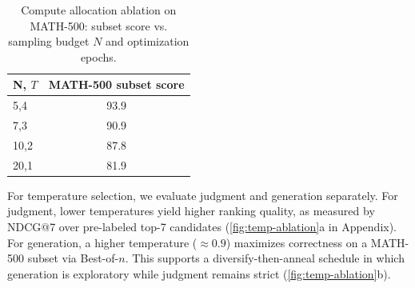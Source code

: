 \documentclass{article}
\theoremstyle{plain}
\theoremstyle{definition}
\theoremstyle{remark}
\begin{document}
\begin{table}[t]
\caption{Compute allocation ablation on MATH-500: subset score vs. sampling budget \(N\) and optimization epochs.}
\label{tab:ablation-N-epochs}
\vskip 0.1in
\centering
\begin{small}
\begin{sc}
\begin{tabular}{lc}
\toprule
N, \(T\) & MATH-500 subset score \\
\midrule
5,4 & 93.9 \\
7,3 & 90.9 \\
10,2 & 87.8 \\
20,1 & 81.9 \\
\bottomrule
\end{tabular}
\end{sc}
\end{small}
\vskip -0.2in
\end{table}


\noindent For temperature selection, we evaluate judgment and generation separately. For judgment, lower temperatures yield higher ranking quality, as measured by NDCG@7 over pre-labeled top-7 candidates (\cref{fig:temp-ablation}a in Appendix). For generation, a higher temperature (\(\approx 0.9\)) maximizes correctness on a MATH-500 subset via Best-of-\(n\). This supports a diversify-then-anneal schedule in which generation is exploratory while judgment remains strict (\cref{fig:temp-ablation}b).

\end{document}
